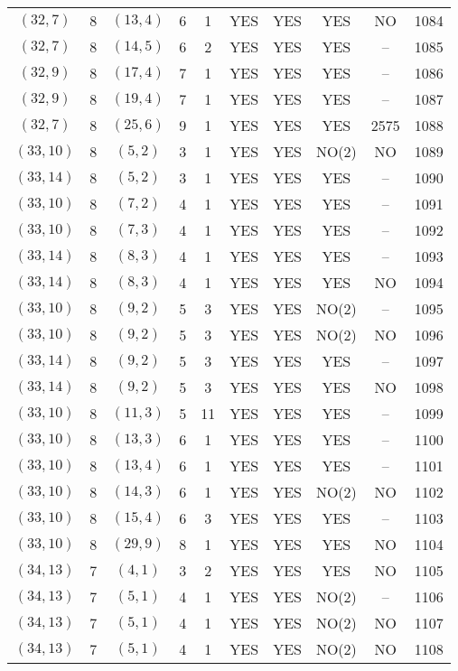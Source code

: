 \begin{longtable}{|c|c|c|c|c|c|c|c|c|c|}
$(32, 7)$ & 8 & $(13, 4)$ & 6 & 1 & YES & YES & YES & NO & 1084\\
$(32, 7)$ & 8 & $(14, 5)$ & 6 & 2 & YES & YES & YES & -- & 1085\\
$(32, 9)$ & 8 & $(17, 4)$ & 7 & 1 & YES & YES & YES & -- & 1086\\
$(32, 9)$ & 8 & $(19, 4)$ & 7 & 1 & YES & YES & YES & -- & 1087\\
$(32, 7)$ & 8 & $(25, 6)$ & 9 & 1 & YES & YES & YES & 2575 & 1088\\
$(33, 10)$ & 8 & $(5, 2)$ & 3 & 1 & YES & YES & NO(2) & NO & 1089\\
$(33, 14)$ & 8 & $(5, 2)$ & 3 & 1 & YES & YES & YES & -- & 1090\\
$(33, 10)$ & 8 & $(7, 2)$ & 4 & 1 & YES & YES & YES & -- & 1091\\
$(33, 10)$ & 8 & $(7, 3)$ & 4 & 1 & YES & YES & YES & -- & 1092\\
$(33, 14)$ & 8 & $(8, 3)$ & 4 & 1 & YES & YES & YES & -- & 1093\\
$(33, 14)$ & 8 & $(8, 3)$ & 4 & 1 & YES & YES & YES & NO & 1094\\
$(33, 10)$ & 8 & $(9, 2)$ & 5 & 3 & YES & YES & NO(2) & -- & 1095\\
$(33, 10)$ & 8 & $(9, 2)$ & 5 & 3 & YES & YES & NO(2) & NO & 1096\\
$(33, 14)$ & 8 & $(9, 2)$ & 5 & 3 & YES & YES & YES & -- & 1097\\
$(33, 14)$ & 8 & $(9, 2)$ & 5 & 3 & YES & YES & YES & NO & 1098\\
$(33, 10)$ & 8 & $(11, 3)$ & 5 & 11 & YES & YES & YES & -- & 1099\\
$(33, 10)$ & 8 & $(13, 3)$ & 6 & 1 & YES & YES & YES & -- & 1100\\
$(33, 10)$ & 8 & $(13, 4)$ & 6 & 1 & YES & YES & YES & -- & 1101\\
$(33, 10)$ & 8 & $(14, 3)$ & 6 & 1 & YES & YES & NO(2) & NO & 1102\\
$(33, 10)$ & 8 & $(15, 4)$ & 6 & 3 & YES & YES & YES & -- & 1103\\
$(33, 10)$ & 8 & $(29, 9)$ & 8 & 1 & YES & YES & YES & NO & 1104\\
$(34, 13)$ & 7 & $(4, 1)$ & 3 & 2 & YES & YES & YES & NO & 1105\\
$(34, 13)$ & 7 & $(5, 1)$ & 4 & 1 & YES & YES & NO(2) & -- & 1106\\
$(34, 13)$ & 7 & $(5, 1)$ & 4 & 1 & YES & YES & NO(2) & NO & 1107\\
$(34, 13)$ & 7 & $(5, 1)$ & 4 & 1 & YES & YES & NO(2) & NO & 1108\\

\end{longtable}
